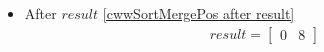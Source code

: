 \begin{frame}[containsverbatim]{\cwwalgortihmexampleframe}
\begin{columns}[c]
\begin{column}{0.65\textwidth}
\begin{multicols}{2}
\begin{itemize}
                            \item After $result$ \cref{cwwSortMergePos after result}
                            \begin{align*}
                                result = \begin{bmatrix}0 & 8\end{bmatrix}
                            \end{align*}
                        \end{itemize}
                    \end{multicols}
                \end{column}
            \end{columns}
        \end{frame}


